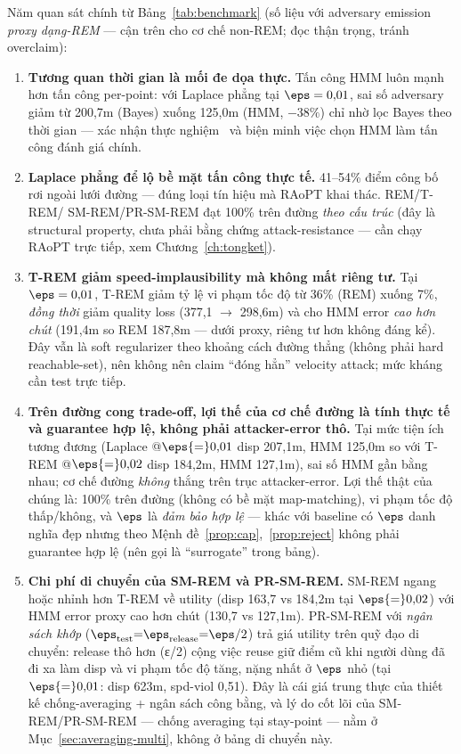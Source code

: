 Năm quan sát chính từ Bảng~\ref{tab:benchmark} (số liệu với adversary emission
\emph{proxy dạng-REM} --- cận trên cho cơ chế non-REM; đọc thận trọng, tránh overclaim):

\begin{enumerate}
  \item \textbf{Tương quan thời gian là mối đe dọa thực.} Tấn công HMM luôn
  mạnh hơn tấn công per-point: với Laplace phẳng tại $\eps = 0{,}01$, sai số
  adversary giảm từ 200,7m (Bayes) xuống 125,0m (HMM, $-38\%$) chỉ nhờ lọc Bayes
  theo thời gian --- xác nhận thực nghiệm~\cite{xiao2015protecting} và biện minh
  việc chọn HMM làm tấn công đánh giá chính.
  \item \textbf{Laplace phẳng để lộ bề mặt tấn công thực tế.} 41--54\% điểm công
  bố rơi ngoài lưới đường --- đúng loại tín hiệu mà RAoPT khai thác. REM/T-REM/
  SM-REM/PR-SM-REM đạt 100\% trên đường \emph{theo cấu trúc} (đây là structural
  property, chưa phải bằng chứng attack-resistance --- cần chạy RAoPT trực tiếp,
  xem Chương~\ref{ch:tongket}).
  \item \textbf{T-REM giảm speed-implausibility mà không mất riêng tư.} Tại
  $\eps = 0{,}01$, T-REM giảm tỷ lệ vi phạm tốc độ từ 36\% (REM) xuống 7\%,
  \emph{đồng thời} giảm quality loss (377,1 $\to$ 298,6m) và cho HMM error
  \emph{cao hơn chút} (191,4m so REM 187,8m --- dưới proxy, riêng tư hơn không đáng
  kể). Đây vẫn là soft regularizer theo khoảng cách đường thẳng (không phải hard
  reachable-set), nên không nên claim ``đóng hẳn'' velocity attack; mức kháng
  cần test trực tiếp.
  \item \textbf{Trên đường cong trade-off, lợi thế của cơ chế đường là tính thực
  tế và guarantee hợp lệ, không phải attacker-error thô.} Tại mức tiện ích tương
  đương (Laplace @$\eps{=}0{,}01$ disp 207,1m, HMM 125,0m so với T-REM
  @$\eps{=}0{,}02$ disp 184,2m, HMM 127,1m), sai số HMM gần bằng nhau; cơ chế
  đường \emph{không} thắng trên trục attacker-error. Lợi thế thật của chúng là:
  100\% trên đường (không có bề mặt map-matching), vi phạm tốc độ thấp/không, và
  $\eps$ là \emph{đảm bảo hợp lệ} --- khác với baseline có $\eps$ danh nghĩa đẹp
  nhưng theo Mệnh đề~\ref{prop:cap},~\ref{prop:reject} không phải guarantee hợp
  lệ (nên gọi là ``surrogate'' trong bảng).
  \item \textbf{Chi phí di chuyển của SM-REM và PR-SM-REM.} SM-REM ngang hoặc
  nhỉnh hơn T-REM về utility (disp 163,7 vs 184,2m tại $\eps{=}0{,}02$) với HMM
  error proxy cao hơn chút (130,7 vs 127,1m).
  PR-SM-REM với \emph{ngân sách khớp} ($\eps_{\text{test}}{=}\eps_{\text{release}}
  {=}\eps/2$) trả giá utility trên quỹ đạo di chuyển: release thô hơn (ε/2) cộng
  việc reuse giữ điểm cũ khi người dùng đã đi xa làm disp và vi phạm tốc độ tăng,
  nặng nhất ở $\eps$ nhỏ (tại $\eps{=}0{,}01$: disp 623m, spd-viol 0,51). Đây là
  cái giá trung thực của thiết kế chống-averaging + ngân sách công bằng, và lý do
  cốt lõi của SM-REM/PR-SM-REM --- chống averaging tại stay-point --- nằm ở
  Mục~\ref{sec:averaging-multi}, không ở bảng di chuyển này.
\end{enumerate}

